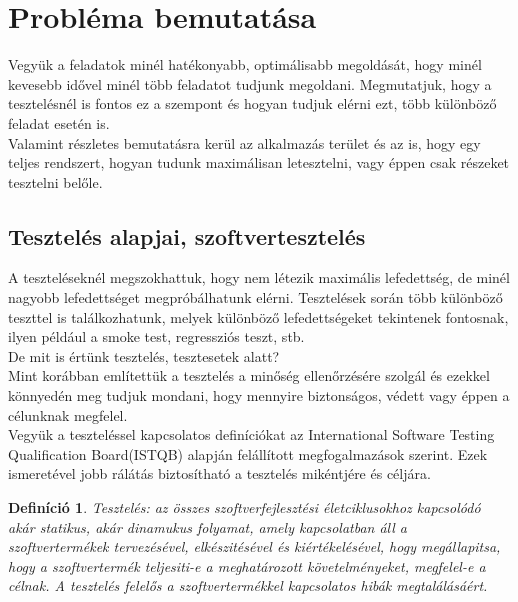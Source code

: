 \documentclass[12pt]{article}
\newtheorem{defin}{Definíció}[section]
\begin{document}
\pagebreak

\section{Probléma bemutatása}

Vegyük a feladatok minél hatékonyabb, optimálisabb megoldását, hogy minél kevesebb idővel minél több feladatot tudjunk megoldani. Megmutatjuk, hogy a tesztelésnél is fontos ez a szempont és hogyan tudjuk elérni ezt, több különböző feladat esetén is.\\
Valamint részletes bemutatásra kerül az alkalmazás terület és az is, hogy egy teljes rendszert, hogyan tudunk maximálisan letesztelni, vagy éppen csak részeket tesztelni belőle.\\

\subsection{Tesztelés alapjai, szoftvertesztelés}

A teszteléseknél megszokhattuk, hogy nem létezik maximális lefedettség, de minél nagyobb lefedettséget megpróbálhatunk elérni. Tesztelések során több különböző teszttel is találkozhatunk, melyek különböző lefedettségeket tekintenek fontosnak, ilyen például a smoke test, regressziós teszt, stb.\\

De mit is értünk tesztelés, tesztesetek alatt?\\
Mint korábban említettük a tesztelés a minőség ellenőrzésére szolgál és ezekkel könnyedén meg tudjuk mondani, hogy mennyire biztonságos, védett vagy éppen a célunknak megfelel.\\

Vegyük a teszteléssel kapcsolatos definíciókat az International Software Testing Qualification Board(ISTQB) alapján felállított megfogalmazások szerint. Ezek ismeretével jobb rálátás biztosítható a tesztelés mikéntjére és céljára.\\

\begin{defin}
Tesztelés: az összes szoftverfejlesztési életciklusokhoz kapcsolódó akár statikus, akár dinamukus folyamat, amely kapcsolatban áll a szoftvertermékek tervezésével, elkészitésével és kiértékelésével, hogy megállapitsa, hogy a szoftvertermék teljesiti-e a meghatározott követelményeket, megfelel-e a célnak. A tesztelés felelős a szoftvertermékkel kapcsolatos hibák megtalálásáért. ~\cite{htb:masterfield}
\end{defin}
\end{document}
